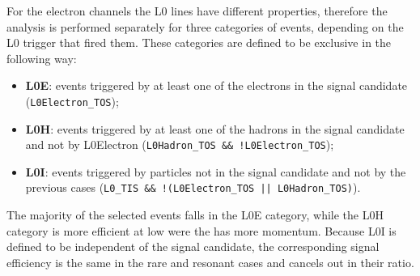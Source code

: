 For the electron channels the L0 lines have different properties, therefore the analysis 
is performed separately for three categories of events, depending on the L0 trigger that fired 
them. These categories are defined to be exclusive in the following way:
%
\begin{itemize}
\item {\bf L0E}: events triggered by at least one of the electrons in the signal candidate (\verb!L0Electron_TOS!);
\item {\bf L0H}: events triggered by at least one of the hadrons in the signal candidate and not by L0Electron (\verb|L0Hadron_TOS && !L0Electron_TOS|);
\item {\bf L0I}: events triggered by particles not in the signal candidate and not by the previous cases 
(\verb|L0_TIS && !(L0Electron_TOS |\verb!|| L0Hadron_TOS)!).
\end{itemize}

The majority of the selected events falls in the L0E category, while
the L0H category is more efficient at low \qsq were the \Kstarz has more momentum.
Because L0I is defined to be independent of the signal candidate, the corresponding
signal efficiency is the same in the rare and resonant cases and cancels out in their ratio.


